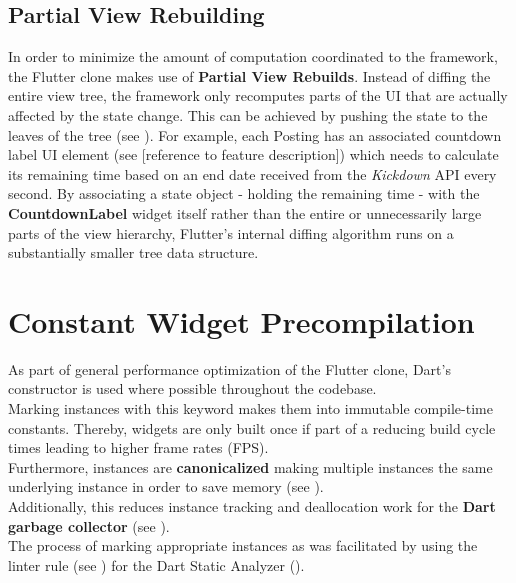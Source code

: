 \subsection{Partial View Rebuilding}
In order to minimize the amount of computation coordinated to the framework, the Flutter clone makes use of \textbf{Partial View Rebuilds}. 
Instead of diffing the entire view tree, the framework only recomputes parts of the UI that are actually affected by the state change. 
This can be achieved by pushing the state to the leaves of the tree (see \cite{StatefulWidgetPerformance2021}).
For example, each Posting has an associated countdown label UI element (see [reference to feature description]) which needs to calculate its remaining time based on an end date received from the \textit{Kickdown} API every second.
By associating a state object - holding the remaining time - with the \textbf{CountdownLabel} widget itself rather than the entire or unnecessarily large parts of the view hierarchy, Flutter's internal diffing algorithm runs on a substantially smaller tree data structure.

\section{Constant Widget Precompilation} \label{section::constant_widget_precompilation}
As part of general performance optimization of the Flutter clone, Dart's  constructor is used where possible throughout the codebase.\\
Marking instances with this keyword makes them into immutable compile-time constants.
Thereby,  widgets are only built once if part of a  reducing build cycle times leading to higher frame rates (FPS).\\
Furthermore, instances are \textbf{canonicalized} making multiple instances the same underlying instance in order to save memory (see \cite{DartConstDocumentation}).\\
Additionally, this reduces instance tracking and deallocation work for the \textbf{Dart garbage collector} (see \cite{DartGarbageCollector2021}).\\
The process of marking appropriate instances as  was facilitated by using the  linter rule (see \cite{ConstLinterRule2021}) for the Dart Static Analyzer (\cite{DartCodeAnalysis2021}). 



